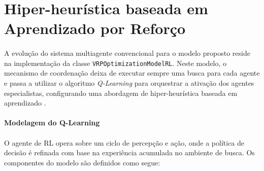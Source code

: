 \section{Hiper-heurística baseada em Aprendizado por Reforço}
\label{sec:hiperheuristica}

\paragraph{} A evolução do sistema multiagente convencional para o modelo proposto reside na implementação da classe \texttt{VRPOptimizationModelRL}. Neste modelo, o mecanismo de coordenação deixa de executar sempre uma busca para cada agente e passa a utilizar o algoritmo \textit{Q-Learning} para orquestrar a ativação dos agentes especialistas, configurando uma abordagem de hiper-heurística baseada em aprendizado \cite{Burke13}.

\paragraph{Modelagem do Q-Learning}

\paragraph{} O agente de RL opera sobre um ciclo de percepção e ação, onde a política de decisão é refinada com base na experiência acumulada no ambiente de busca. Os componentes do modelo são definidos como segue:

